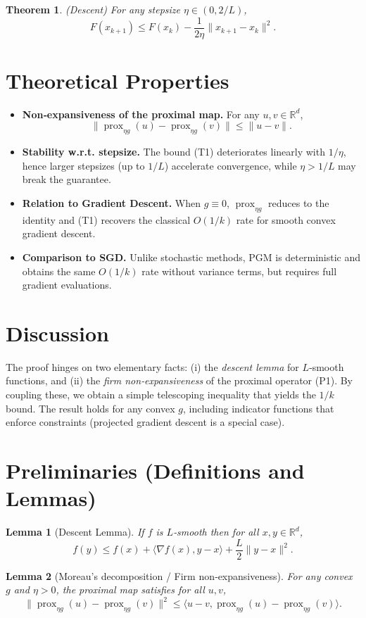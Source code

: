 \documentclass{article}
\newtheorem{theorem}{Theorem}
\newtheorem{lemma}{Lemma}
\newcommand{\prox}{\operatorname{prox}}
\newcommand{\R}{\mathbb{R}}
\begin{document}
\begin{theorem}
\label{thm:monotone}
(Descent) For any stepsize $\eta\in(0,2/L)$,
\[
F(x_{k+1})\le F(x_{k})-\frac{1}{2\eta}\|x_{k+1}-x_{k}\|^{2}.
\tag{T2}
\]
\end{theorem}

\section*{Theoretical Properties}
\begin{itemize}
\item \textbf{Non‑expansiveness of the proximal map.} For any $u,v\in\R^{d}$,
\[
\|\prox_{\eta g}(u)-\prox_{\eta g}(v)\|\le\|u-v\|. \tag{P1}
\]
\item \textbf{Stability w.r.t. stepsize.} The bound (T1) deteriorates linearly with $1/\eta$, hence larger stepsizes (up to $1/L$) accelerate convergence, while $\eta>1/L$ may break the guarantee.
\item \textbf{Relation to Gradient Descent.} When $g\equiv0$, $\prox_{\eta g}$ reduces to the identity and (T1) recovers the classical $O(1/k)$ rate for smooth convex gradient descent.
\item \textbf{Comparison to SGD.} Unlike stochastic methods, PGM is deterministic and obtains the same $O(1/k)$ rate without variance terms, but requires full gradient evaluations.
\end{itemize}

\section*{Discussion}
The proof hinges on two elementary facts: (i) the \emph{descent lemma} for $L$‑smooth functions, and (ii) the \emph{firm non‑expansiveness} of the proximal operator (P1). By coupling these, we obtain a simple telescoping inequality that yields the $1/k$ bound. The result holds for any convex $g$, including indicator functions that enforce constraints (projected gradient descent is a special case).

\section*{Preliminaries (Definitions and Lemmas)}
\begin{lemma}[Descent Lemma]\label{lem:descent}
If $f$ is $L$‑smooth then for all $x,y\in\R^{d}$,
\[
f(y)\le f(x)+\langle\nabla f(x),y-x\rangle+\frac{L}{2}\|y-x\|^{2}.
\tag{L1}
\]
\end{lemma}
\begin{lemma}[Moreau’s decomposition / Firm non‑expansiveness]\label{lem:prox}
For any convex $g$ and $\eta>0$, the proximal map satisfies for all $u,v$,
\[
\|\prox_{\eta g}(u)-\prox_{\eta g}(v)\|^{2}
\le\langle u-v,\prox_{\eta g}(u)-\prox_{\eta g}(v)\rangle.
\tag{L2}
\]
\end{lemma}
\end{document}
